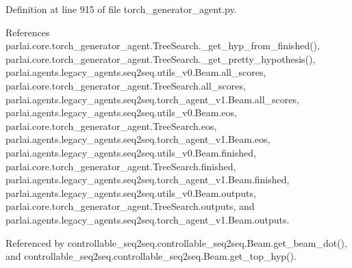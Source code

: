 Definition at line 915 of file torch\+\_\+generator\+\_\+agent.\+py.



References parlai.\+core.\+torch\+\_\+generator\+\_\+agent.\+Tree\+Search.\+\_\+get\+\_\+hyp\+\_\+from\+\_\+finished(), parlai.\+core.\+torch\+\_\+generator\+\_\+agent.\+Tree\+Search.\+\_\+get\+\_\+pretty\+\_\+hypothesis(), parlai.\+agents.\+legacy\+\_\+agents.\+seq2seq.\+utils\+\_\+v0.\+Beam.\+all\+\_\+scores, parlai.\+core.\+torch\+\_\+generator\+\_\+agent.\+Tree\+Search.\+all\+\_\+scores, parlai.\+agents.\+legacy\+\_\+agents.\+seq2seq.\+torch\+\_\+agent\+\_\+v1.\+Beam.\+all\+\_\+scores, parlai.\+agents.\+legacy\+\_\+agents.\+seq2seq.\+utils\+\_\+v0.\+Beam.\+eos, parlai.\+core.\+torch\+\_\+generator\+\_\+agent.\+Tree\+Search.\+eos, parlai.\+agents.\+legacy\+\_\+agents.\+seq2seq.\+torch\+\_\+agent\+\_\+v1.\+Beam.\+eos, parlai.\+agents.\+legacy\+\_\+agents.\+seq2seq.\+utils\+\_\+v0.\+Beam.\+finished, parlai.\+core.\+torch\+\_\+generator\+\_\+agent.\+Tree\+Search.\+finished, parlai.\+agents.\+legacy\+\_\+agents.\+seq2seq.\+torch\+\_\+agent\+\_\+v1.\+Beam.\+finished, parlai.\+agents.\+legacy\+\_\+agents.\+seq2seq.\+utils\+\_\+v0.\+Beam.\+outputs, parlai.\+core.\+torch\+\_\+generator\+\_\+agent.\+Tree\+Search.\+outputs, and parlai.\+agents.\+legacy\+\_\+agents.\+seq2seq.\+torch\+\_\+agent\+\_\+v1.\+Beam.\+outputs.



Referenced by controllable\+\_\+seq2seq.\+controllable\+\_\+seq2seq.\+Beam.\+get\+\_\+beam\+\_\+dot(), and controllable\+\_\+seq2seq.\+controllable\+\_\+seq2seq.\+Beam.\+get\+\_\+top\+\_\+hyp().

